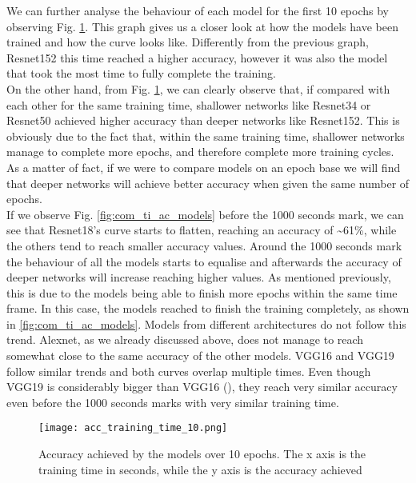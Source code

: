 We can further analyse the behaviour of each model for the first 10 epochs by observing Fig. \ref{fig:acc_training_10}. This graph gives us a closer look at how the models have been trained and how the curve looks like. Differently from the previous graph, Resnet152 this time reached a higher accuracy, however it was also the model that took the most time to fully complete the training.\\
On the other hand, from Fig. \ref{fig:acc_training_10}, we can clearly observe  that, if compared with each other for the same training time, shallower networks like Resnet34 or Resnet50 achieved higher accuracy than deeper networks like Resnet152. This is obviously due to the fact that, within the same training time, shallower networks manage to complete more epochs, and therefore complete more training cycles. As a matter of fact, if we were to compare models on an epoch base we will find that deeper networks will achieve better accuracy when given the same number of epochs. \\
If we observe Fig. \ref{fig:com_ti_ac_models} before the 1000 seconds mark, we can see that Resnet18's curve starts to flatten, reaching an accuracy of \textasciitilde 61\%, while the others tend to reach smaller accuracy values. Around the 1000 seconds mark the behaviour of all the models starts to equalise and afterwards the accuracy of deeper networks will increase reaching higher values. As mentioned previously, this is due to the models being able to finish more epochs within the same time frame. In this case, the models reached to finish the training completely, as shown in \ref{fig:com_ti_ac_models}. 
Models from different architectures do not follow this trend. Alexnet, as we already discussed above, does not manage to reach somewhat close to the same accuracy of the other models. VGG16 and VGG19 follow similar trends and both curves overlap multiple times.  Even though VGG19 is considerably bigger than VGG16 (\cite{simonyan2015deep}), they reach very similar accuracy even before the 1000 seconds marks with very similar training time. \\
\begin{figure}[h]
       \centering 
	    \texttt{[image: acc\_training\_time\_10.png]}
        \caption[Accuracy achieved by the models over 10 epochs]{Accuracy achieved by the models over 10 epochs. The x axis is the training time in seconds, while the y axis is the accuracy achieved}
         \label{fig:acc_training_10}
\end{figure}


